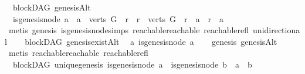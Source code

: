 \begin{isabellebody}
\isamarkupfalse%
\ {\isacharparenleft}{\kern0pt}\ blockDAG{\isacharparenright}{\kern0pt}\ genesisAlt{}\ {\isacharcolon}{\kern0pt}\isanewline
\ \ {\isachardoublequoteopen}{\isacharparenleft}{\kern0pt}is{\isacharunderscore}{\kern0pt}genesis{\isacharunderscore}{\kern0pt}node\ a{\isacharparenright}{\kern0pt}\ {\isasymlongleftrightarrow}\ {\isacharparenleft}{\kern0pt}{\isacharparenleft}{\kern0pt}a\ {\isasymin}\ verts\ G{\isacharparenright}{\kern0pt}\ {\isasymand}\ {\isacharparenleft}{\kern0pt}{\isasymforall}r{\isachardot}{\kern0pt}\ \ {\isacharparenleft}{\kern0pt}r\ {\isasymin}\ verts\ G{\isacharparenright}{\kern0pt}\ {\isasymlongrightarrow}\ r\ {\isasymrightarrow}\isactrlsup {\isacharplus}{\kern0pt}\ a\ {\isasymor}\ r\ {\isacharequal}{\kern0pt}\ a{\isacharparenright}{\kern0pt}{\isacharparenright}{\kern0pt}{\isachardoublequoteclose}\isanewline
%
\isadelimproof
\ \ %
\endisadelimproof
%
\isatagproof
{}\isamarkupfalse%
\ {\isacharparenleft}{\kern0pt}metis\ genesis\ is{\isacharunderscore}{\kern0pt}genesis{\isacharunderscore}{\kern0pt}node{\isachardot}{\kern0pt}simps\ reachable{}{\isacharunderscore}{\kern0pt}reachable\ reachable{\isacharunderscore}{\kern0pt}refl\ unidirectional{\isacharparenright}{\kern0pt}%
\endisatagproof
{\isafoldproof}%
%
\isadelimproof
\ \isanewline
%
\endisadelimproof
\isanewline
{}\isamarkupfalse%
\ {\isacharparenleft}{\kern0pt}\ blockDAG{\isacharparenright}{\kern0pt}\ genesis{\isacharunderscore}{\kern0pt}existAlt{\isacharcolon}{\kern0pt}\isanewline
\ \ {\isachardoublequoteopen}{\isasymexists}a{\isachardot}{\kern0pt}\ is{\isacharunderscore}{\kern0pt}genesis{\isacharunderscore}{\kern0pt}node\ a{\isachardoublequoteclose}\isanewline
%
\isadelimproof
\ \ %
\endisadelimproof
%
\isatagproof
{}\isamarkupfalse%
\ genesis\ genesisAlt\isanewline
\ \ \isamarkupfalse%
\ {\isacharparenleft}{\kern0pt}metis\ reachable{}{\isacharunderscore}{\kern0pt}reachable\ reachable{\isacharunderscore}{\kern0pt}refl{\isacharparenright}{\kern0pt}%
\endisatagproof
{\isafoldproof}%
%
\isadelimproof
\ \ \isanewline
%
\endisadelimproof
\isanewline
{}\isamarkupfalse%
\ {\isacharparenleft}{\kern0pt}\ blockDAG{\isacharparenright}{\kern0pt}\ unique{\isacharunderscore}{\kern0pt}genesis{\isacharcolon}{\kern0pt}\ {\isachardoublequoteopen}is{\isacharunderscore}{\kern0pt}genesis{\isacharunderscore}{\kern0pt}node\ a\ {\isasymand}\ is{\isacharunderscore}{\kern0pt}genesis{\isacharunderscore}{\kern0pt}node\ b\ {\isasymlongrightarrow}\ a\ {\isacharequal}{\kern0pt}\ b{\isachardoublequoteclose}\isanewline

\end{isabellebody}
